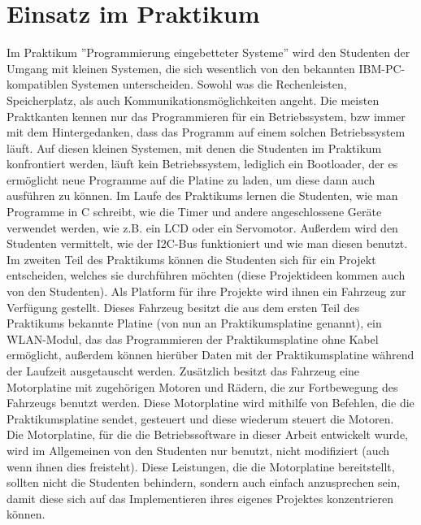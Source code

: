 \chapter{Einsatz im Praktikum}
Im Praktikum ''Programmierung eingebetteter Systeme'' wird den Studenten der
Umgang mit kleinen Systemen, die sich wesentlich von den bekannten IBM-PC-kompatiblen
Systemen unterscheiden. Sowohl was die Rechenleisten, Speicherplatz, als auch
Kommunikationsmöglichkeiten angeht. Die meisten Praktkanten kennen nur das Programmieren
für ein Betriebssystem, bzw immer mit dem Hintergedanken, dass das Programm auf einem
solchen Betriebssystem läuft. Auf diesen kleinen Systemen, mit denen die Studenten im
Praktikum konfrontiert werden, läuft kein Betriebssystem, lediglich ein Bootloader, der
es ermöglicht neue Programme auf die Platine zu laden, um diese dann auch ausführen zu können.
Im Laufe des Praktikums lernen die Studenten, wie man Programme in C schreibt, wie die Timer
und andere angeschlossene Geräte verwendet werden, wie z.B. ein LCD oder ein Servomotor.
Außerdem wird den Studenten vermittelt, wie der I2C-Bus funktioniert und wie man diesen benutzt.\\
Im zweiten Teil des Praktikums können die Studenten sich für ein Projekt entscheiden,
welches sie durchführen möchten (diese Projektideen kommen auch von den Studenten).
Als Platform für ihre Projekte wird ihnen ein Fahrzeug zur Verfügung gestellt. Dieses
Fahrzeug besitzt die aus dem ersten Teil des Praktikums bekannte Platine (von nun an
Praktikumsplatine genannt), ein WLAN-Modul, das das Programmieren der Praktikumsplatine
ohne Kabel ermöglicht, außerdem können hierüber Daten mit der Praktikumsplatine während
der Laufzeit ausgetauscht werden. Zusätzlich besitzt das Fahrzeug eine Motorplatine mit
zugehörigen Motoren und Rädern, die zur Fortbewegung des Fahrzeugs benutzt werden. Diese
Motorplatine wird mithilfe von Befehlen, die die Praktikumsplatine sendet, gesteuert und
diese wiederum steuert die Motoren.\\
Die Motorplatine, für die die Betriebssoftware in dieser Arbeit entwickelt wurde, wird
im Allgemeinen von den Studenten nur benutzt, nicht modifiziert (auch wenn ihnen dies
freisteht). Diese Leistungen, die die Motorplatine bereitstellt, sollten nicht die Studenten
behindern, sondern auch einfach anzusprechen sein, damit diese sich auf das Implementieren
ihres eigenes Projektes konzentrieren können.\\
